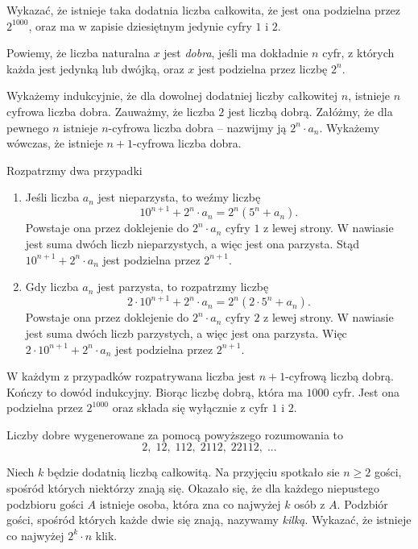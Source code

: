 \begin{problem}{3}
	Wykazać, że istnieje taka dodatnia liczba całkowita, że jest ona podzielna przez $2^{1000}$, oraz ma w zapisie dziesiętnym jedynie cyfry $1$ i $2$.
\end{problem}

\noindent
Powiemy, że liczba naturalna $x$ jest \textit{dobra}, jeśli ma dokładnie $n$ cyfr, z których każda jest jedynką lub dwójką, oraz $x$ jest podzielna przez liczbę $2^n$. 

\vspace{5px}
\noindent
Wykażemy indukcyjnie, że dla dowolnej dodatniej liczby całkowitej $n$, istnieje $n$ cyfrowa liczba dobra. Zauważmy, że liczba $2$ jest liczbą dobrą. Załóżmy, że dla pewnego $n$ istnieje $n$-cyfrowa liczba dobra -- nazwijmy ją $2^n \cdot a_n$. Wykażemy wówczas, że istnieje $n + 1$-cyfrowa liczba dobra.

\vspace{5px}
\noindent
Rozpatrzmy dwa przypadki
\begin{enumerate}
	\item Jeśli liczba $a_n$ jest nieparzysta, to weźmy liczbę 
	\[
		10^{n + 1} + 2^n \cdot a_n = 2^n\left(5^n + a_n\right).
	\]
	Powstaje ona przez doklejenie do $2^n \cdot a_n$ cyfry $1$ z lewej strony.
	W nawiasie jest suma dwóch liczb nieparzystych, a więc jest ona parzysta. Stąd $10^{n + 1} + 2^n \cdot a_n $ jest podzielna przez $2^{n + 1}$.
	\item Gdy liczba $a_n$ jest parzysta, to rozpatrzmy liczbę 
	\[
		2 \cdot 10^{n + 1} + 2^n \cdot a_n = 2^n\left(2 \cdot 5^n + a_n\right).
	\]
	Powstaje ona przez doklejenie do $2^n \cdot a_n$ cyfry $2$ z lewej strony.
	W nawiasie jest suma dwóch liczb parzystych, a więc jest ona parzysta. Więc $2 \cdot 10^{n + 1} + 2^n \cdot a_n $ jest podzielna przez $2^{n + 1}$.
\end{enumerate}
W każdym z przypadków rozpatrywana liczba jest $n + 1$-cyfrową liczbą dobrą. Kończy to dowód indukcyjny. Biorąc liczbę dobrą, która ma $1000$ cyfr. Jest ona podzielna przez $2^{1000}$ oraz składa się wyłącznie z cyfr $1$ i $2$.

\begin{remark}
	Liczby dobre wygenerowane za pomocą powyższego rozumowania to
	\[
		2, \; 12, \; 112, \; 2112, \; 22112, \; ...
	\]
\end{remark}

\begin{problem}{4}
	Niech $k$ będzie dodatnią liczbą całkowitą. Na przyjęciu spotkało sie $n \geqslant 2$ gości, spośród których niektórzy znają się. Okazało się, że dla każdego niepustego podzbioru gości $A$ istnieje osoba, która zna co najwyżej $k$ osób z $A$. Podzbiór gości, spośród których każde dwie się znają, nazywamy \textit{kilką}. Wykazać, że istnieje co najwyżej $2^k \cdot n$ klik.
\end{problem}

